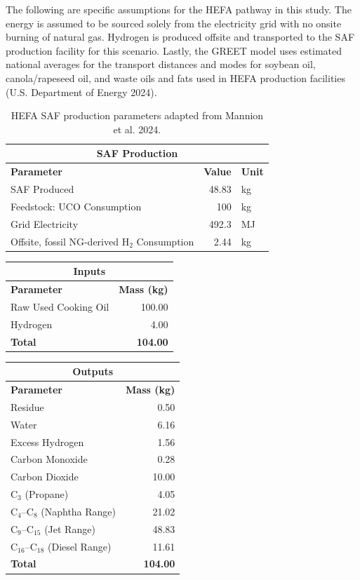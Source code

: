 \documentclass[12pt]{article}
\begin{document}
\begin{Appendix}
The following are specific assumptions for the HEFA pathway in this study. The energy is assumed to be sourced solely from the electricity grid with no onsite burning of natural gas. Hydrogen is produced offsite and transported to the SAF production facility for this scenario. Lastly, the GREET model uses estimated national averages for the transport distances and modes for soybean oil, canola/rapeseed oil, and waste oils and fats used in HEFA production facilities (U.S. Department of Energy 2024).

\begin{table}[H]
\centering
\begin{tabular}{|l|r|l|}
\hline
\multicolumn{3}{|c|}{\textbf{SAF Production}} \\
\hline
\textbf{Parameter} & \textbf{Value} & \textbf{Unit} \\
\hline
SAF Produced & 48.83 & kg \\
Feedstock: UCO Consumption & 100 & kg \\
Grid Electricity & 492.3 & MJ \\
Offsite, fossil NG-derived H$_2$ Consumption & 2.44 & kg \\
\hline
\end{tabular}
\caption{HEFA SAF production parameters adapted from Mannion et al. 2024.}
\label{tab:saf_production}
\end{table}
\begin{table}[H]
\centering
\begin{tabular}{|l|r|}
\hline
\multicolumn{2}{|c|}{\textbf{Inputs}} \\
\hline
\textbf{Parameter} & \textbf{Mass (kg)} \\
\hline
Raw Used Cooking Oil & 100.00 \\
Hydrogen & 4.00 \\
\hline
\textbf{Total} & \textbf{104.00} \\
\hline
\end{tabular}

\begin{tabular}{|l|r|}
\hline
\multicolumn{2}{|c|}{\textbf{Outputs}} \\
\hline
\textbf{Parameter} & \textbf{Mass (kg)} \\
\hline
Residue & 0.50 \\
Water & 6.16 \\
Excess Hydrogen & 1.56 \\
Carbon Monoxide & 0.28 \\
Carbon Dioxide & 10.00 \\
C$_3$ (Propane) & 4.05 \\
C$_4$--C$_8$ (Naphtha Range) & 21.02 \\
C$_9$--C$_{15}$ (Jet Range) & 48.83 \\
C$_{16}$--C$_{18}$ (Diesel Range) & 11.61 \\
\hline
\textbf{Total} & \textbf{104.00} \\
\hline
\end{tabular}


\end{table}
\end{Appendix}
\end{document}
